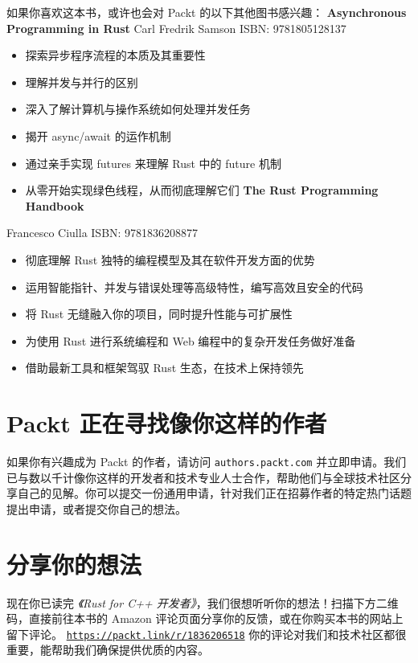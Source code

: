 如果你喜欢这本书，或许也会对 Packt 的以下其他图书感兴趣：
\textbf{Asynchronous Programming in Rust}
Carl Fredrik Samson
ISBN: 9781805128137
\begin{itemize}
  \item 探索异步程序流程的本质及其重要性
  \item 理解并发与并行的区别
  \item 深入了解计算机与操作系统如何处理并发任务
  \item 揭开 async/\allowbreak{}await 的运作机制
  \item 通过亲手实现 futures 来理解 Rust 中的 future 机制
  \item 从零开始实现绿色线程，从而彻底理解它们 \textbf{The Rust Programming Handbook}
\end{itemize}
Francesco Ciulla
ISBN: 9781836208877
\begin{itemize}
  \item 彻底理解 Rust 独特的编程模型及其在软件开发方面的优势
  \item 运用智能指针、并发与错误处理等高级特性，编写高效且安全的代码
  \item 将 Rust 无缝融入你的项目，同时提升性能与可扩展性
  \item 为使用 Rust 进行系统编程和 Web 编程中的复杂开发任务做好准备
  \item 借助最新工具和框架驾驭 Rust 生态，在技术上保持领先
\end{itemize}
\section{Packt 正在寻找像你这样的作者}
如果你有兴趣成为 Packt 的作者，请访问 \texttt{authors.\allowbreak{}packt.\allowbreak{}com} 并立即申请。我们已与数以千计像你这样的开发者和技术专业人士合作，帮助他们与全球技术社区分享自己的见解。你可以提交一份通用申请，针对我们正在招募作者的特定热门话题提出申请，或者提交你自己的想法。
\section{分享你的想法}
现在你已读完 \emph{《Rust for C++ 开发者》}，我们很想听听你的想法！扫描下方二维码，直接前往本书的 Amazon 评论页面分享你的反馈，或在你购买本书的网站上留下评论。
\href{https://packt.link/r/1836206518}{\texttt{https:/\allowbreak{}/\allowbreak{}packt.\allowbreak{}link/\allowbreak{}r/\allowbreak{}1836206518}}
你的评论对我们和技术社区都很重要，能帮助我们确保提供优质的内容。
